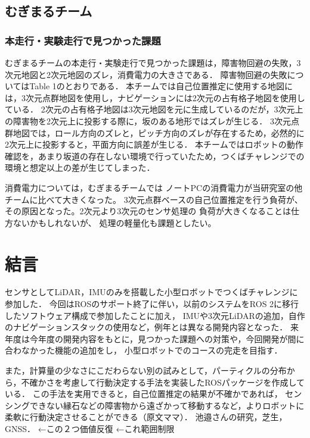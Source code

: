 \documentclass[twocolumn,9pt]{jsproceedings}
\begin{document}
\subsection{むぎまるチーム}
\subsubsection{本走行・実験走行で見つかった課題}

むぎまるチームの本走行・実験走行で見つかった課題は，障害物回避の失敗，3次元地図と2次元地図のズレ，消費電力の大きさである．
障害物回避の失敗についてはTable 1のとおりである．
本チームでは自己位置推定に使用する地図には，3次元点群地図を使用し，ナビゲーションには2次元の占有格子地図を使用している．
2次元の占有格子地図は3次元地図を元に生成しているのだが，3次元上の障害物を2次元上に投影する際に，坂のある地形ではズレが生じる．
3次元点群地図では，ロール方向のズレと，ピッチ方向のズレが存在するため，必然的に2次元上に投影すると，平面方向に誤差が生じる．
本チームではロボットの動作確認を，あまり坂道の存在しない環境で行っていたため，つくばチャレンジでの環境と想定以上の差が生じてしまった．

消費電力については，むぎまるチームでは
ノートPCの消費電力が当研究室の他チームに比べて大きくなった。
3次元点群ベースの自己位置推定を行う負荷が、
その原因となった。2次元より3次元のセンサ処理の
負荷が大きくなることは仕方ないかもしれないが、
処理の軽量化も課題としたい。


\section{結言}
センサとしてLiDAR，IMUのみを搭載した小型ロボットでつくばチャレンジに参加した．
今回はROSのサポート終了に伴い，以前のシステムをROS 2に移行したソフトウェア構成で参加したことに加え，
IMUや3次元LiDARの追加，自作のナビゲーションスタックの使用など，例年とは異なる開発内容となった．
来年度は今年度の開発内容をもとに，見つかった課題への対策や，今回開発が間に合わなかった機能の追加をし，
小型ロボットでのコースの完走を目指す．

また，計算量の少なさにこだわらない別の試みとして，パーティクルの分布から，不確かさを考慮して行動決定する手法を実装したROSパッケージを作成している\cite{pfc}．
この手法を実用できると，自己位置推定の結果が不確かであれば，
センシングできない縁石などの障害物から遠ざかって移動するなど，よりロボットに柔軟に行動決定させることができる（原文ママ）．
池邉さんの研究，芝生，GNSS．
\cite{tonouchi2023}
\cite{ueda2023JRM}
←この２つ価値反復
\cite{ikebeMECH}
←これ範囲制限
\end{document}
